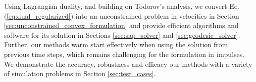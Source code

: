 Using Lagrangian duality, and building on Todorov's analysis, we convert Eq.
(\ref{eq:dual_regularized}) into an unconstrained problem in velocities in
Section \ref{sec:unconstrained_convex_formulation} and provide efficient
algorithms and software for its solution in Sections \ref{sec:sap_solver} and
\ref{sec:geodesic_solver}. Further, our methods warm start effectively when
using the solution from previous time steps, which remains challenging for the
formulation in impulses. We demonstrate the accuracy, robustness and efficacy
our methods with a variety of simulation problems in Section
\ref{sec:test_cases}.

